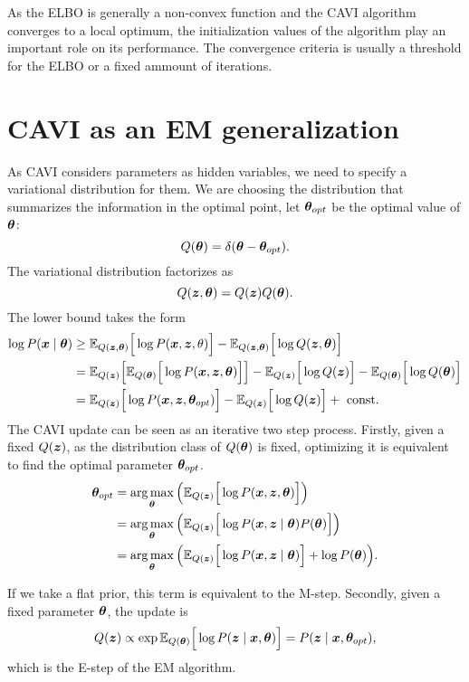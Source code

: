As the ELBO is generally a non-convex function and the CAVI algorithm converges to a local optimum, the initialization values of the algorithm play an important role on its performance. The convergence criteria is usually a threshold for the ELBO or a fixed ammount of iterations.

\section{CAVI as an EM generalization}\label{sec:CAVI_EM}

As CAVI considers parameters as hidden variables, we need to specify a variational distribution for them. We are choosing the distribution that summarizes the information in the optimal point, let \(\bm{\theta}_{opt}\) be the optimal value of \(\bm{\theta}\):
\[
  Q(\bm{\theta}) = \delta(\bm{\theta} - \bm{\theta}_{opt}).
\]
The variational distribution factorizes as
\[
  Q(\bm{z}, \bm{\theta}) = Q(\bm{z})Q(\bm{\theta}).
\]
The lower bound takes the form
\[
  \begin{aligned}
    \log{P(\bm{x}\mid \bm{\theta})} &\geq \mathbb{E}_{Q(\bm{z}, \bm{\theta})}\Big[\log{P(\bm{x}, \bm{z}, \theta)}\Big] - \mathbb{E}_{Q(\bm{z}, \bm{\theta})}\Big[\log{Q(\bm{z}, \bm{\theta})}\Big] \\
    &= \mathbb{E}_{Q(\bm{z})}\Big[\mathbb{E}_{Q(\bm{\theta})}\Big[\log{P(\bm{x}, \bm{z}, \bm{\theta})}\Big]\Big] - \mathbb{E}_{Q(\bm{z})}\Big[\log{Q(\bm{z})}\Big] - \mathbb{E}_{Q(\bm{\theta})}\Big[\log{Q(\bm{\theta})}\Big] \\
    &= \mathbb{E}_{Q(\bm{z})}\Big[\log{P(\bm{x}, \bm{z}, \bm{\theta}_{opt})}\Big] - \mathbb{E}_{Q(\bm{z})}\Big[\log{Q(\bm{z})}\Big] + \text{ const. }
  \end{aligned}
\]
The CAVI update can be seen as an iterative two step process. Firstly, given a fixed \(Q(\bm{z})\), as the distribution class of \(Q(\bm{\theta})\) is fixed, optimizing it is equivalent to find the optimal parameter \(\bm{\theta}_{opt}\). 
\[
  \begin{aligned}
    \bm{\theta}_{opt} &= \operatorname*{arg\,max}_{\bm{\theta}} \Big( \mathbb{E}_{Q(\bm{z})}\Big[\log{P(\bm{x},\bm{z},\bm{\theta})}\Big] \Big)\\
    &=  \operatorname*{arg\,max}_{\bm{\theta}} \Big( \mathbb{E}_{Q(\bm{z})}\Big[\log{P(\bm{x}, \bm{z}\mid \bm{\theta})P(\bm{\theta})}\Big] \Big) \\
    &= \operatorname*{arg\,max}_{\bm{\theta}} \Big( \mathbb{E}_{Q(\bm{z})}\Big[\log{P(\bm{x}, \bm{z}\mid \bm{\theta})}\Big] + \log{P(\bm{\theta})} \Big). \\
  \end{aligned}
\]

If we take a flat prior, this term is equivalent to the M-step. Secondly, given a fixed parameter \(\bm{\theta}\), the update is
\[
  Q(\bm{z}) \propto \exp \mathbb{E}_{Q(\bm{\theta})}\Big[\log P(\bm{z} \mid \bm{x}, \bm{\theta})\Big] =  P(\bm{z} \mid \bm{x}, \bm{\theta}_{opt}),
\]
which is the E-step of the EM algorithm.
